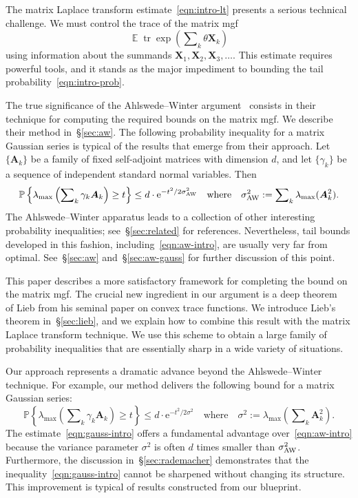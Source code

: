 \documentclass[11pt,letterpaper,twoside,reqno,draft]{amsart}
\theoremstyle{remark}
\numberwithin{equation}{section}
\numberwithin{thm}{section}
\begin{document}
The matrix Laplace transform estimate~\eqref{eqn:intro-lt} presents a serious technical challenge.  We must control the trace of the matrix mgf
$$
{\operatorname{\mathbb{E}}} {\operatorname{tr}} \exp\left( \sum\nolimits_k \theta {\bm{{X}}}_k \right)
$$
using information about the summands ${\bm{{X}}}_1, {\bm{{X}}}_2, {\bm{{X}}}_3, \dots$.  This estimate requires powerful tools, and it stands as the major impediment to bounding the tail probability~\eqref{eqn:intro-prob}. 

The true significance of the Ahlswede--Winter argument~\cite[App.]{AW02:Strong-Converse} consists in their technique for computing the required bounds on the matrix mgf.  We describe their method in~\S\ref{sec:aw}.  The following probability inequality for a matrix Gaussian series is typical of the results that emerge from their approach.  Let $\{ {\bm{{A}}}_k \}$ be a family of fixed self-adjoint matrices with dimension $d$, and let $\{\gamma_k\}$ be a sequence of independent standard normal variables.  Then
\begin{equation} \label{eqn:aw-intro}
{\mathbb{P}\left\{ {{ \lambda_{\max}\left( \sum\nolimits_k \gamma_k {\bm{{A}}}_k \right) \geq t }} \right\}}
	\leq d \cdot {\mathrm{e}}^{-t^2/2\sigma_{\rm AW}^2}
	\quad\text{where}\quad
	\sigma_{\rm AW}^2 := \sum\nolimits_k \lambda_{\max}( {\bm{{A}}}_k^2 ).
\end{equation}
The Ahlswede--Winter apparatus leads to a collection of other interesting probability inequalities; see~\S\ref{sec:related} for references.  Nevertheless, tail bounds developed in this fashion, including~\eqref{eqn:aw-intro}, are usually very far from optimal.  See~\S\ref{sec:aw} and~\S\ref{sec:aw-gauss} for further discussion of this point.

This paper describes a more satisfactory framework for completing the bound on the matrix mgf.
The crucial new ingredient in our argument is a deep theorem~\cite[Thm.~6]{Lie73:Convex-Trace} of Lieb from his seminal paper on convex trace functions. 
We introduce Lieb's theorem in~\S\ref{sec:lieb}, and we explain how to combine this result with the matrix Laplace transform technique.  We use this scheme to obtain a large family of probability inequalities that are essentially sharp in a wide variety of situations.  

Our approach represents a dramatic advance beyond the Ahlswede--Winter technique.  For example, our method delivers the following bound for a matrix Gaussian series:
\begin{equation} \label{eqn:gauss-intro}
{\mathbb{P}\left\{ {{ \lambda_{\max}\left( \sum\nolimits_k \gamma_k {\bm{{A}}}_k \right) \geq t }} \right\}}
	\leq d \cdot {\mathrm{e}}^{-t^2/2\sigma^2}
	\quad\text{where}\quad
	\sigma^2 := \lambda_{\max}\left( \sum\nolimits_k  {\bm{{A}}}_k^2 \right).
\end{equation}
The estimate~\eqref{eqn:gauss-intro} offers a fundamental advantage over~\eqref{eqn:aw-intro} because the variance parameter $\sigma^2$ is often $d$ times smaller than $\sigma^2_{\rm AW}$.  Furthermore, the discussion in~\S\ref{sec:rademacher} demonstrates that the inequality~\eqref{eqn:gauss-intro} cannot be sharpened without changing its structure.  This improvement is typical of results constructed from our blueprint.
\end{document}
